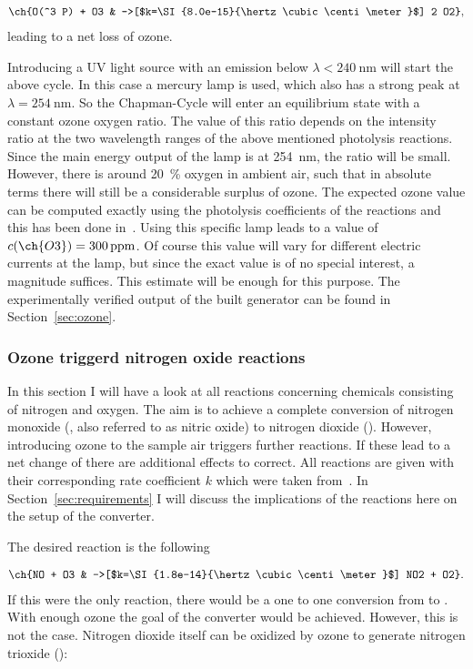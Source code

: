 \begin{align*}
  \ch{O(^3 P) + O3 & ->[$k=\SI{8.0e-15}{\hertz\cubic\centi\meter}$] 2 O2},
\end{align*}
leading to a net loss of ozone. 

Introducing a UV light source with an emission below
$\lambda < \SI{240}{\nano\meter}$ will start the above cycle. In this
case a mercury lamp is used, which also has a strong peak at
$\lambda = \SI{254}{\nano\meter}$. So the Chapman-Cycle will enter an
equilibrium state with a constant ozone oxygen ratio. The value of
this ratio depends on the intensity ratio at the two wavelength ranges
of the above mentioned photolysis reactions. Since the main energy
output of the lamp is at \SI{254}{\nano\meter}, the ratio will be
small. However, there is around \SI{20}{\%} oxygen in ambient air,
such that in absolute terms there will still be a considerable surplus
of ozone. The expected ozone value can be computed exactly using the
photolysis coefficients of the reactions and this has been done
in~\cite{bsc}. Using this specific lamp leads to a value of
$c(\ch{O3}) = \SI{300}{ppm}$. Of course this value will vary for
different electric currents at the lamp, but since the exact value is
of no special interest, a magnitude suffices. This estimate will be
enough for this purpose. The experimentally verified output of the
built generator can be found in Section~\ref{sec:ozone}.

\subsubsection{Ozone triggerd nitrogen oxide reactions}
\label{sec:o-no}

In this section I will have a look at all reactions concerning
chemicals consisting of nitrogen and oxygen. The aim is to achieve a
complete conversion of nitrogen monoxide (, also referred to as
nitric oxide) to nitrogen dioxide (). However, introducing
ozone to the sample air triggers further reactions. If these lead to a
net change of  there are additional effects to correct. All
reactions are given with their corresponding rate coefficient $k$
which were taken from~\cite{bsc}. In Section~\ref{sec:requirements} I
will discuss the implications of the reactions here on the setup of
the converter.

The desired reaction is the following

\begin{align}
  \ch{NO + O3 & ->[$k=\SI{1.8e-14}{\hertz\cubic\centi\meter}$] NO2
                + O2}. \label{eq:no}
\end{align}
If this were the only reaction, there would be a one to one conversion
from  to . With enough ozone the goal of the converter
would be achieved. However, this is not the case. Nitrogen dioxide
itself can be oxidized by ozone to generate nitrogen trioxide
():

